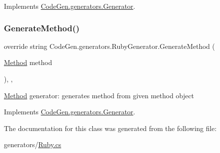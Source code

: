 Implements \mbox{\hyperlink{classCodeGen_1_1generators_1_1Generator_a0d1a48aedbca08c05af734a43739d1c3}{Code\+Gen.\+generators.\+Generator}}.

\mbox{\label{classCodeGen_1_1generators_1_1RubyGenerator_aa37c187dae8e400b050dcddba10d216b}} 
\subsubsection{\texorpdfstring{Generate\+Method()}{GenerateMethod()}}
{\footnotesize\ttfamily override string Code\+Gen.\+generators.\+Ruby\+Generator.\+Generate\+Method (\begin{DoxyParamCaption}\item[{\mbox{\hyperlink{classCodeGen_1_1generators_1_1Method}{Method}}}]{method }\end{DoxyParamCaption})\hspace{0.3cm}{\ttfamily [inline]}, {\ttfamily [protected]}, {\ttfamily [virtual]}}



\mbox{\hyperlink{classCodeGen_1_1generators_1_1Method}{Method}} generator\+: generates method from given method object  



Implements \mbox{\hyperlink{classCodeGen_1_1generators_1_1Generator_a04fc9bd217b3b8c3d5f7b1a3f92c79d3}{Code\+Gen.\+generators.\+Generator}}.



The documentation for this class was generated from the following file\+:\begin{DoxyCompactItemize}
\item 
generators/\mbox{\hyperlink{Ruby_8cs}{Ruby.\+cs}}\end{DoxyCompactItemize}
